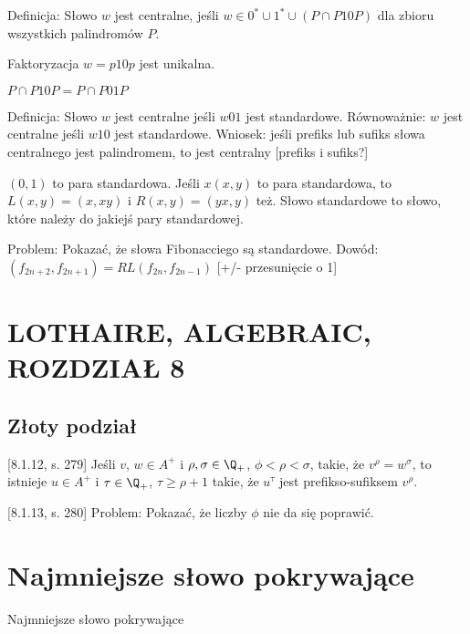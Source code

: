 Definicja: Słowo $w$ jest centralne, jeśli $w \in 0^* \cup 1^* \cup (P \cap P10P)$ dla zbioru wszystkich palindromów $P$.

Faktoryzacja $w = p10p$ jest unikalna.

$P \cap P10P = P \cap P01P$

Definicja: Słowo $w$ jest centralne jeśli $w01$ jest standardowe.
Równoważnie: $w$ jest centralne jeśli $w10$ jest standardowe.
Wniosek: jeśli prefiks lub sufiks słowa centralnego jest palindromem, to jest centralny [prefiks i sufiks?]

$(0, 1)$ to para standardowa. Jeśli $x(x, y)$ to para standardowa, to $L(x, y) = (x, xy)$ i $R(x, y) = (yx, y)$ też.
Słowo standardowe to słowo, które należy do jakiejś pary standardowej.

Problem: Pokazać, że słowa Fibonacciego są standardowe.
Dowód: $(f_{2n + 2}, f_{2n + 1}) = RL(f_{2n}, f_{2n - 1})$ [+/- przesunięcie o 1]

\section{LOTHAIRE, ALGEBRAIC, ROZDZIAŁ 8}

\subsection{Złoty podział}

[8.1.12, s. 279]
Jeśli $v$, $w \in A^+$ i $\rho, \sigma \in \Q_+$, $\phi < \rho < \sigma$, takie, że $v^\rho = w^\sigma$, to istnieje $u \in A^+$ i $\tau \in \Q_+$, $\tau \ge \rho + 1$ takie, że $u^\tau$ jest prefikso-sufiksem $v^\rho$.

[8.1.13, s. 280]
Problem: Pokazać, że liczby $\phi$ nie da się poprawić.


\section{Najmniejsze słowo pokrywające}

\begin{algorithm}[H]
    \caption{Najmniejsze słowo pokrywające}
\end{algorithm}


